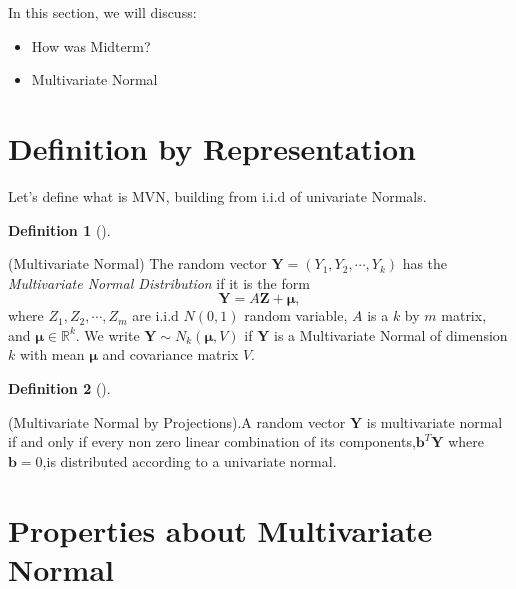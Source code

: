 \documentclass[
  letterpaper,
  DIV=11,
  numbers=noendperiod]{scrreprt}
\providecommand{\tightlist}{%
  \setlength{\itemsep}{0pt}\setlength{\parskip}{0pt}}\usepackage{longtable,booktabs,array}
\theoremstyle{plain}
\theoremstyle{definition}
\newtheorem{definition}{Definition}[chapter]
\theoremstyle{remark}
\begin{document}

In this section, we will discuss:

\begin{itemize}
\tightlist
\item
  How was Midterm?
\item
  Multivariate Normal
\end{itemize}

\hypertarget{definition-by-representation}{%
\section*{Definition by
Representation}\label{definition-by-representation}}


Let's define what is MVN, building from i.i.d of univariate Normals.

\leavevmode{}%
\begin{definition}[]\label{def-MVN}

(Multivariate Normal) The random vector
\(\mathbf{Y} = (Y_1, Y_2, \cdots, Y_k)\) has the \emph{Multivariate
Normal Distribution} if it is the form
\[\mathbf{Y} = A \mathbf{Z} + \mathbf{\mu}, \] where
\(Z_1, Z_2, \cdots, Z_m\) are i.i.d \(N(0,1)\) random variable, \(A\) is
a \(k\) by \(m\) matrix, and \(\mathbf{\mu} \in \mathbb{R}^k\). We write
\(\mathbf{Y} \sim N_k(\mathbf{\mu}, V)\) if \(\mathbf{Y}\) is a
Multivariate Normal of dimension \(k\) with mean \(\mathbf{\mu}\) and
covariance matrix \(V\).

\end{definition}

\leavevmode{}%
\begin{definition}[]\label{def-MVN-2}

(Multivariate Normal by Projections).A random vector \(\mathbf{Y}\) is
multivariate normal if and only if every non zero linear combination of
its components,\(\mathbf{b}^T\mathbf{Y}\) where \(\mathbf{b}=0\),is
distributed according to a univariate normal.

\end{definition}

\hypertarget{properties-about-multivariate-normal}{%
\section*{Properties about Multivariate
Normal}\label{properties-about-multivariate-normal}}
\end{document}
